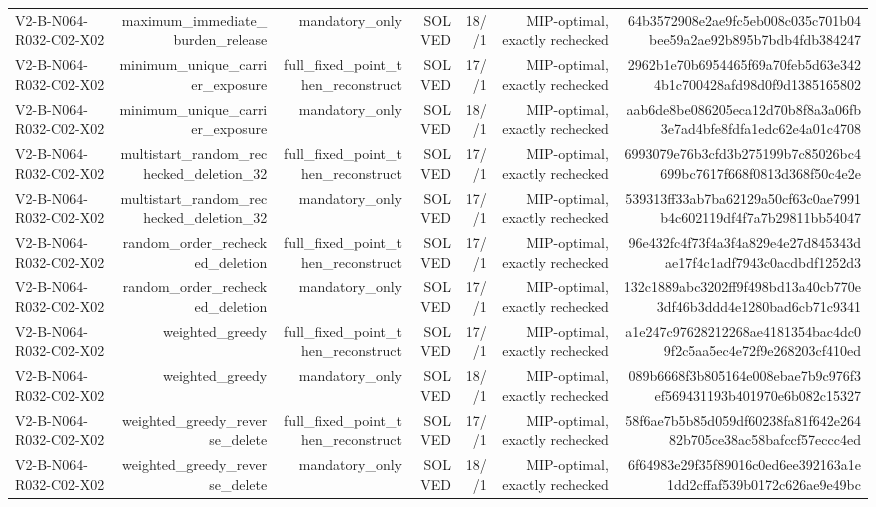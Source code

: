 {\begin{longtable}{lrrrrrr}
V2-B-N064-R032-C02-X02 & maximum\_immediate\_burden\_release & mandatory\_only & SOLVED & 18//1 & MIP-optimal, exactly rechecked & 64b3572908e2ae9fc5eb008c035c701b04bee59a2ae92b895b7bdb4fdb384247 \\
V2-B-N064-R032-C02-X02 & minimum\_unique\_carrier\_exposure & full\_fixed\_point\_then\_reconstruct & SOLVED & 17//1 & MIP-optimal, exactly rechecked & 2962b1e70b6954465f69a70feb5d63e3424b1c700428afd98d0f9d1385165802 \\
V2-B-N064-R032-C02-X02 & minimum\_unique\_carrier\_exposure & mandatory\_only & SOLVED & 18//1 & MIP-optimal, exactly rechecked & aab6de8be086205eca12d70b8f8a3a06fb3e7ad4bfe8fdfa1edc62e4a01c4708 \\
V2-B-N064-R032-C02-X02 & multistart\_random\_rechecked\_deletion\_32 & full\_fixed\_point\_then\_reconstruct & SOLVED & 17//1 & MIP-optimal, exactly rechecked & 6993079e76b3cfd3b275199b7c85026bc4699bc7617f668f0813d368f50c4e2e \\
V2-B-N064-R032-C02-X02 & multistart\_random\_rechecked\_deletion\_32 & mandatory\_only & SOLVED & 17//1 & MIP-optimal, exactly rechecked & 539313ff33ab7ba62129a50cf63c0ae7991b4c602119df4f7a7b29811bb54047 \\
V2-B-N064-R032-C02-X02 & random\_order\_rechecked\_deletion & full\_fixed\_point\_then\_reconstruct & SOLVED & 17//1 & MIP-optimal, exactly rechecked & 96e432fc4f73f4a3f4a829e4e27d845343dae17f4c1adf7943c0acdbdf1252d3 \\
V2-B-N064-R032-C02-X02 & random\_order\_rechecked\_deletion & mandatory\_only & SOLVED & 17//1 & MIP-optimal, exactly rechecked & 132c1889abc3202ff9f498bd13a40cb770e3df46b3ddd4e1280bad6cb71c9341 \\
V2-B-N064-R032-C02-X02 & weighted\_greedy & full\_fixed\_point\_then\_reconstruct & SOLVED & 17//1 & MIP-optimal, exactly rechecked & a1e247c97628212268ae4181354bac4dc09f2c5aa5ec4e72f9e268203cf410ed \\
V2-B-N064-R032-C02-X02 & weighted\_greedy & mandatory\_only & SOLVED & 18//1 & MIP-optimal, exactly rechecked & 089b6668f3b805164e008ebae7b9c976f3ef569431193b401970e6b082c15327 \\
V2-B-N064-R032-C02-X02 & weighted\_greedy\_reverse\_delete & full\_fixed\_point\_then\_reconstruct & SOLVED & 17//1 & MIP-optimal, exactly rechecked & 58f6ae7b5b85d059df60238fa81f642e26482b705ce38ac58bafccf57eccc4ed \\
V2-B-N064-R032-C02-X02 & weighted\_greedy\_reverse\_delete & mandatory\_only & SOLVED & 18//1 & MIP-optimal, exactly rechecked & 6f64983e29f35f89016c0ed6ee392163a1e1dd2cffaf539b0172c626ae9e49bc \\

\end{longtable}}
